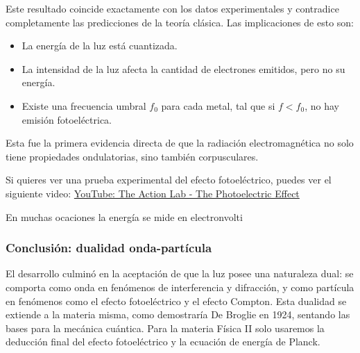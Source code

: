 Este resultado coincide exactamente con los datos experimentales y contradice completamente las predicciones de la teoría clásica. Las implicaciones de esto son:

\begin{itemize}
  \item La energía de la luz está cuantizada.
  \item La intensidad de la luz afecta la cantidad de electrones emitidos, pero no su energía.
  \item Existe una frecuencia umbral \(f_0\) para cada metal, tal que si \(f < f_0\), no hay emisión fotoeléctrica.
\end{itemize}

Esta fue la primera evidencia directa de que la radiación electromagnética no solo tiene propiedades ondulatorias, sino también corpusculares.

Si quieres ver una prueba experimental del efecto fotoeléctrico, puedes ver el siguiente video: \href{https://youtu.be/oYnp0WZDhYQ?si=kIBH75DIIDv5hg_4}{YouTube: The Action Lab - The Photoelectric Effect}

\begin{tcolorbox}[myconclusion]
  En muchas ocaciones la energía se mide en electronvolti
\end{tcolorbox}

\subsubsection{Conclusión: dualidad onda-partícula}

El desarrollo culminó en la aceptación de que la luz posee una naturaleza dual: se comporta como onda en fenómenos de interferencia y difracción, y como partícula en fenómenos como el efecto fotoeléctrico y el efecto Compton. Esta dualidad se extiende a la materia misma, como demostraría De Broglie en 1924, sentando las bases para la mecánica cuántica. Para la materia Física II solo usaremos la deducción final del efecto fotoeléctrico y la ecuación de energía de Planck.